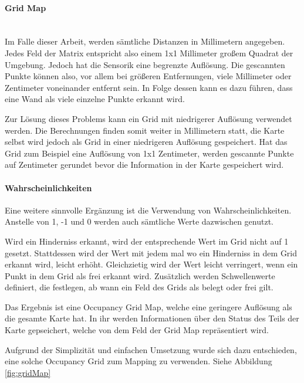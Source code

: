 \paragraph{Grid Map} \mbox{}\\
Im Falle dieser Arbeit, werden sämtliche Distanzen in Millimetern angegeben.
Jedes Feld der Matrix entspricht also einem 1x1 Millimeter großem Quadrat der Umgebung.
Jedoch hat die Sensorik eine begrenzte Auflösung.
Die gescannten Punkte können also, vor allem bei größeren Entfernungen, viele Millimeter oder Zentimeter voneinander entfernt sein.
In Folge dessen kann es dazu führen, dass eine Wand als viele einzelne Punkte erkannt wird.

Zur Lösung dieses Problems kann ein Grid mit niedrigerer Auflösung verwendet werden.
Die Berechnungen finden somit weiter in Millimetern statt, die Karte selbst wird jedoch als Grid in einer niedrigeren Auflösung gespeichert.
Hat das Grid zum Beispiel eine Auflösung von 1x1 Zentimeter, werden gescannte Punkte auf Zentimeter gerundet bevor die Information in der Karte gespeichert wird.

\paragraph{Wahrscheinlichkeiten}
Eine weitere sinnvolle Ergänzung ist die Verwendung von Wahrscheinlichkeiten.
Anstelle von 1, -1 und 0 werden auch sämtliche Werte dazwischen genutzt.

Wird ein Hinderniss erkannt, wird der entsprechende Wert im Grid nicht auf 1 gesetzt.
Stattdessen wird der Wert mit jedem mal wo ein Hinderniss in dem Grid erkannt wird, leicht erhöht.
Gleichzietig wird der Wert leicht verringert, wenn ein Punkt in dem Grid als frei erkannt wird.
Zusätzlich werden Schwellenwerte definiert, die festlegen, ab wann ein Feld des Grids als belegt oder frei gilt.

Das Ergebnis ist eine Occupancy Grid Map, welche eine geringere Auflösung als die gesamte Karte hat.
In ihr werden Informationen über den Status des Teils der Karte gepseichert, welche von dem Feld der Grid Map repräsentiert wird.

Aufgrund der Simplizität und einfachen Umsetzung wurde sich dazu entschieden, eine solche Occupancy Grid zum Mapping zu verwenden.
Siehe Abbildung \ref{fig:gridMap}

